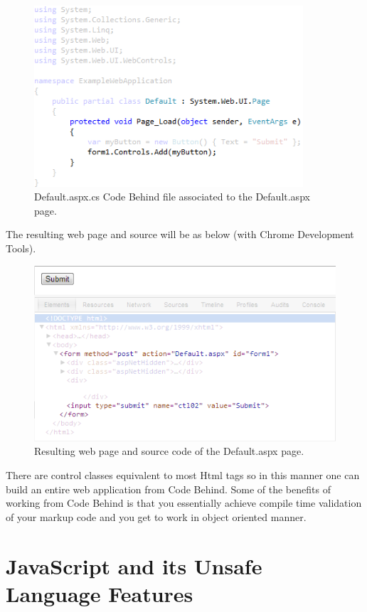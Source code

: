 				\begin{figure}
					\includegraphics[width=10cm]{resources/images/CodeBehind.png}
				\caption{Default.aspx.cs Code Behind file associated to the Default.aspx page.}
				\label{codeBehind}
			\end{figure}
	The resulting web page and source will be as below (with Chrome Development Tools).

				\begin{figure}
					\includegraphics[width=12cm]{resources/images/Html.png}
				\caption{Resulting web page and source code of the Default.aspx page.}
				\label{html}
			\end{figure}
	There are control classes equivalent to most Html tags so in this manner one can build an entire web application from Code Behind. Some of the benefits of working from Code Behind is that you essentially achieve compile time validation of your markup code and you get to work in object oriented manner.


\section{JavaScript and its Unsafe Language Features}

